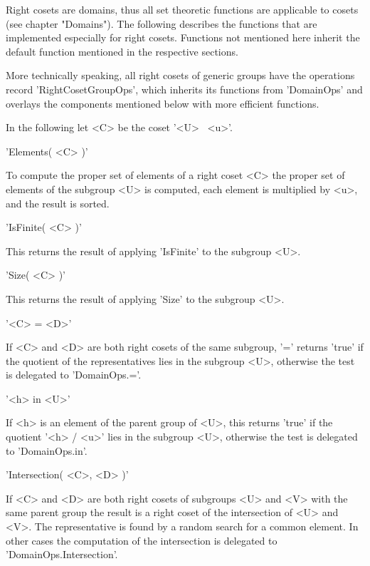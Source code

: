 Right cosets are domains, thus all set theoretic functions are applicable
to cosets (see chapter "Domains").  The following describes the functions
that  are  implemented  especially  for  right  cosets.    Functions  not
mentioned here inherit the default function  mentioned in the  respective
sections.

More technically speaking, all  right cosets of  generic groups  have the
operations record 'RightCosetGroupOps', which inherits its functions from
'DomainOps'  and overlays   the  components   mentioned below  with  more
efficient functions.

In the following let <C> be the coset '<U> \*\ <u>'.

\vspace{5mm}
'Elements( <C> )'%

To compute the proper set of elements of a right coset <C> the proper set
of elements of the subgroup  <U> is computed,  each element is multiplied
by <u>, and the result is sorted.

\vspace{5mm}
'IsFinite( <C> )'%

This returns the result of applying 'IsFinite' to the subgroup <U>.

\vspace{5mm}
'Size( <C> )'%

This returns the result of applying 'Size' to the subgroup <U>.

\vspace{5mm}
'<C> = <D>'%

If  <C> and <D> are  both right cosets  of the same subgroup, '=' returns
'true' if the quotient  of the representatives lies  in the subgroup <U>,
otherwise the test is delegated to 'DomainOps.='.

\vspace{5mm}
'<h> in <U>'%

If <h> is an element of  the parent group of <U>,  this returns 'true' if
the quotient '<h> / <u>' lies in the subgroup <U>,  otherwise the test is
delegated to 'DomainOps.in'.

\vspace{5mm}
'Intersection( <C>, <D> )'%

If <C> and <D>  are both right cosets  of subgroups <U>  and <V> with the
same parent group the result is a right coset  of the intersection of <U>
and <V>.  The representative  is found by   a random search for  a common
element.  In other cases the computation of the intersection is delegated
to 'DomainOps.Intersection'.

